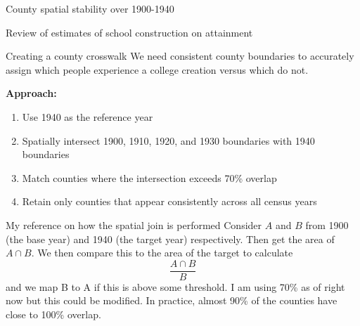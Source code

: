 \documentclass[notes,11pt, aspectratio=169]{beamer}
\begin{document}
\appendix
{}

\begin{frame}[label=spatialstability]{County spatial stability over 1900-1940}
    

    \vspace{1em}
    \centering
    \hyperlink{isolating}{}
\end{frame}


\begin{frame}[label=reviewestimates]{Review of estimates of school construction on attainment}
  

  \vspace{1em}
  \centering
  \hyperlink{effects}{}
\end{frame}

\begin{frame}[label=countycrosswalk]{Creating a county crosswalk}
We need consistent county boundaries to accurately assign which people experience a college creation versus which do not.

\textbf{Approach:}
\begin{enumerate}
\item Use 1940 as the reference year
\item Spatially intersect 1900, 1910, 1920, and 1930 boundaries with 1940 boundaries
\item Match counties where the intersection exceeds 70\% overlap
\item Retain only counties that appear consistently across all census years
\end{enumerate}
\vspace{1em}
\centering
\hyperlink{isolating}{}
\end{frame}

\begin{frame}{My reference on how the spatial join is performed}
  Consider $A$ and $B$ from 1900 (the base year) and 1940 (the target year) respectively. Then get the area of $A\cap B$. We then compare this to the area of the target to calculate 
  \begin{equation}
  \frac{A\cap B}{B}  
  \end{equation}
  and we map B to A if this is above some threshold. I am using 70\% as of right now but this could be modified. In practice, almost 90\% of the counties have close to 100\% overlap.
\end{frame}
\end{document}

